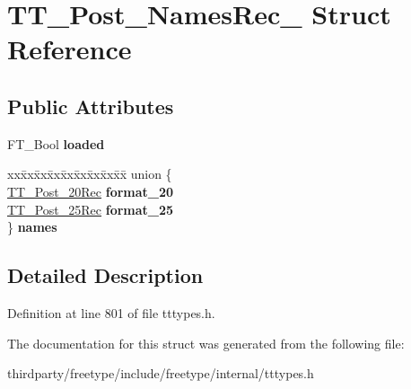 \hypertarget{struct_t_t___post___names_rec__}{}\section{T\+T\+\_\+\+Post\+\_\+\+Names\+Rec\+\_\+ Struct Reference}
\label{struct_t_t___post___names_rec__}
\subsection*{Public Attributes}
\begin{DoxyCompactItemize}
\item 
\mbox{\label{struct_t_t___post___names_rec___a8878ac4555c3df60958869f0d53383c9}} 
F\+T\+\_\+\+Bool {\bfseries loaded}
\item 
\mbox{\label{struct_t_t___post___names_rec___a0ce144a028f92d03b0480323104433b9}} 
\begin{tabbing}
xx\=xx\=xx\=xx\=xx\=xx\=xx\=xx\=xx\=\kill
union \{\\
\>\hyperlink{struct_t_t___post__20_rec__}{TT\_Post\_20Rec} {\bfseries format\_20}\\
\>\hyperlink{struct_t_t___post__25__}{TT\_Post\_25Rec} {\bfseries format\_25}\\
\} {\bfseries names}\\

\end{tabbing}\end{DoxyCompactItemize}


\subsection{Detailed Description}


Definition at line 801 of file tttypes.\+h.



The documentation for this struct was generated from the following file\+:\begin{DoxyCompactItemize}
\item 
thirdparty/freetype/include/freetype/internal/tttypes.\+h\end{DoxyCompactItemize}
